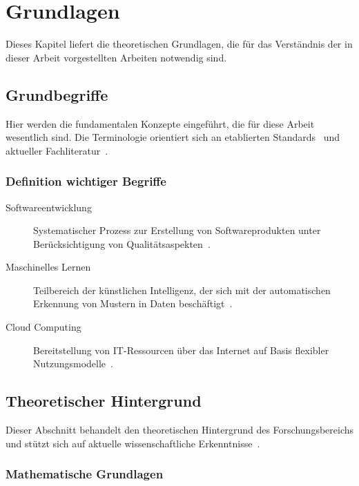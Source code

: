 \chapter{Grundlagen}
\label{ch:fundamentals}

Dieses Kapitel liefert die theoretischen Grundlagen, die für das Verständnis der in dieser Arbeit vorgestellten Arbeiten notwendig sind.

\section{Grundbegriffe}
\label{sec:basic_concepts}

Hier werden die fundamentalen Konzepte eingeführt, die für diese Arbeit wesentlich sind.
Die Terminologie orientiert sich an etablierten Standards~\cite{example_standard} und aktueller Fachliteratur~\cite{example_book}.

\subsection{Definition wichtiger Begriffe}
\label{subsec:definitions}

\begin{description}
	\item[Softwareentwicklung] Systematischer Prozess zur Erstellung von Softwareprodukten unter Berücksichtigung von Qualitätsaspekten~\cite{example_book}.
	\item[Maschinelles Lernen] Teilbereich der künstlichen Intelligenz, der sich mit der automatischen Erkennung von Mustern in Daten beschäftigt~\cite{example_conference}.
	\item[Cloud Computing] Bereitstellung von IT-Ressourcen über das Internet auf Basis flexibler Nutzungsmodelle~\cite{example_report}.
\end{description}

\section{Theoretischer Hintergrund}
\label{sec:theoretical_background}

Dieser Abschnitt behandelt den theoretischen Hintergrund des Forschungsbereichs und stützt sich auf aktuelle wissenschaftliche Erkenntnisse~\cite{example_article}.

\subsection{Mathematische Grundlagen}
\label{subsec:math_foundations}

